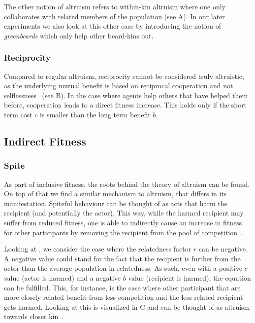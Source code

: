 \documentclass[sigconf]{acmart}
\newcommand{\greenbeards}{\textit{greenbeards}\xspace}
\begin{document}
    The other notion of altruism refers to within-kin altruism where one only collaborates with related members of the population (see  A).
    In our later experiments we also look at this other case by introducing the notion of \greenbeards which only help other beard-kins out.

    \subsubsection{Reciprocity}\label{reciprocity}
    Compared to regular altruism, reciprocity cannot be considered truly altruistic, as the underlying mutual benefit is based on reciprocal cooperation and not selflessness~\cite{triversEvolutionReciprocalAltruism1971} (see  B).
    In the case where agents help others that have helped them before, cooperation leads to a direct fitness increase.
    This holds only if the short term cost $c$ is smaller than the long term benefit $b$.

    \subsection{Indirect Fitness}\label{subsec:indirect_fitness}

    \subsubsection{Spite}
    As part of inclusive fitness, the roots behind the theory of altruism can be found.
    On top of that we find a similar mechanism to altruism, that differs in its manifestation.
    Spiteful behaviour can be thought of as acts that harm the recipient (and potentially the actor).
    This way, while the harmed recipient may suffer from reduced fitness, one is able to indirectly cause an increase in fitness for other participants by removing the recipient from the pool of competition~\cite{hamiltonSelfishSpitefulBehaviour1970}.

    Looking at , we consider the case where the relatedness factor $r$ can be negative.
    A negative value could stand for the fact that the recipient is further from the actor than the average population in relatedness.
    As such, even with a positive $c$ value (actor is harmed) and a negative $b$ value (recipient is harmed), the equation can be fulfilled.
    This, for instance, is the case where other participant that are more closely related benefit from less competition and the less related recipient gets harmed.
    Looking at  this is visualized in  C and can be thought of as altruism towards closer kin~\cite{west_altruism_2010}.
\end{document}

